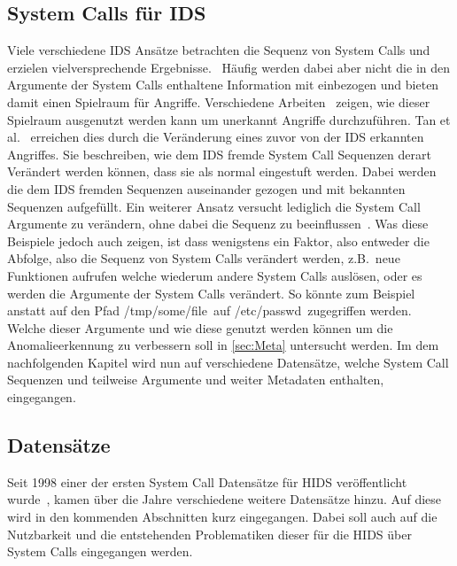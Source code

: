         \subsection{System Calls für IDS}
            Viele verschiedene \ac{IDS} Ansätze betrachten die Sequenz von System Calls und erzielen vielversprechende Ergebnisse.~\cite{MAGGI}
            Häufig werden dabei aber nicht die in den Argumente der System Calls enthaltene Information mit einbezogen und bieten damit einen Spielraum für Angriffe.
            Verschiedene Arbeiten~\cite{Syscallseqexploit1, Syscallseqexploit2, Syscallseqexploit3} zeigen, wie dieser Spielraum ausgenutzt werden kann um unerkannt Angriffe durchzuführen. 
            Tan et al.~\cite{Syscallseqexploit3} erreichen dies durch die Veränderung eines zuvor von der \ac{IDS} erkannten Angriffes.
            Sie beschreiben, wie dem \ac{IDS} fremde System Call Sequenzen derart Verändert werden können, dass sie als normal eingestuft werden.
            Dabei werden die dem \ac{IDS} fremden Sequenzen auseinander gezogen und mit bekannten Sequenzen aufgefüllt. 
            Ein weiterer Ansatz versucht lediglich die System Call Argumente zu verändern, ohne dabei die Sequenz zu beeinflussen~\cite{Syscallseqexploit1}.
            Was diese Beispiele jedoch auch zeigen, ist dass wenigstens ein Faktor, also entweder die Abfolge, also die Sequenz von System Calls verändert werden, z.B.\ neue Funktionen aufrufen welche wiederum andere System Calls auslösen, oder es werden die Argumente der System Calls verändert.
            So könnte zum Beispiel anstatt auf den Pfad \glqq /tmp/some/file\grqq \ auf \glqq /etc/passwd\grqq \ zugegriffen werden. 
            Welche dieser Argumente und wie diese genutzt werden können um die Anomalieerkennung zu verbessern soll in \autoref{sec:Meta} untersucht werden.
            Im dem nachfolgenden Kapitel wird nun auf verschiedene Datensätze, welche System Call Sequenzen und teilweise Argumente und weiter Metadaten enthalten, eingegangen.

        \subsection{Datensätze}\label{sec:Datensatz}
            Seit 1998 einer der ersten System Call Datensätze für HIDS veröffentlicht wurde~\cite{DARPA, KDD},
            kamen über die Jahre verschiedene weitere Datensätze hinzu.
            Auf diese wird in den kommenden Abschnitten kurz eingegangen.
            Dabei soll auch auf die Nutzbarkeit und die entstehenden Problematiken dieser für die \ac{HIDS} über System Calls eingegangen werden.
